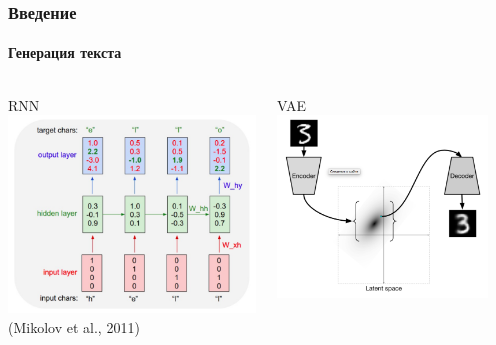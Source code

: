 \documentclass[10pt]{beamer}
\begin{document}
\begin{frame}
\frametitle{Введение}
\framesubtitle{Генерация текста}

\begin{columns}[T]
    \begin{column}[T]{0.33\textwidth}
        \begin{center}
            RNN \\
            \includegraphics[width=\textwidth]{images/rnn.png} \\
            (Mikolov et al., 2011)
        \end{center}
    \end{column}
    \vline
    \begin{column}[T]{0.33\textwidth}
        \begin{center}
            VAE \\
            \includegraphics[width=0.9\textwidth]{images/vae.png} \\

\end{center}
\end{column}
\end{columns}
\end{frame}
\end{document}
